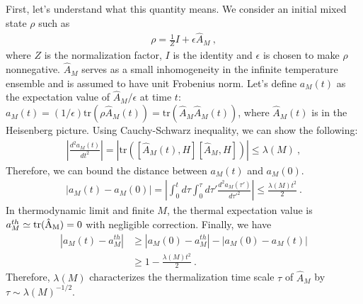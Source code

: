 \documentclass[twocolumn,superscriptaddress, prb]{revtex4-1}
\begin{document}
First, let's understand what this quantity means.
We consider an initial mixed state $\rho$ such as
\begin{align}\label{eq:initial}
\rho = \frac{1}{Z}I + \epsilon\hat{A}_M ~,
\end{align}
where $Z$ is the normalization factor, $I$ is the identity and $\epsilon$ is chosen to make $\rho$ nonnegative.
$\hat{A}_M$ serves as a small inhomogeneity in the infinite temperature ensemble and
is assumed to have unit Frobenius norm.
Let's define $a_M(t)$ as the expectation value of $\hat{A}_M/\epsilon$ at time $t$:
$a_M(t) = (1/\epsilon)\mathrm{tr}(\rho \hat{A}_M(t)) = \mathrm{tr}(\hat{A}_M \hat{A}_M(t))$,
where $\hat{A}_M(t)$ is in the Heisenberg picture.
Using Cauchy-Schwarz inequality, we can show the following:
\begin{align}
\left|\frac{d^2 a_M(t)}{dt^2}\right| = |\mathrm{tr}([\hat{A}_M(t),H][\hat{A}_M,H])| \leq \lambda(M) ~,
\end{align}
Therefore, we can bound the distance between $a_M(t)$ and $a_M(0)$.
\begin{align}
|a_M(t) - a_M(0)| = \left|\int^t_0 d\tau \int^\tau_0 d\tau' \frac{d^2 a_M(\tau')}{d\tau'^2}\right| \leq \frac{\lambda(M) t^2}{2} ~.
\end{align}
In thermodynamic limit and finite $M$, the thermal expectation value is
$a_M^{th} \simeq \rm{tr}(\hat{A}_M) = 0$ with negligible correction.
Finally, we have
\begin{align}
|a_M(t) - a_M^{th}| &\geq |a_M(0) - a_M^{th}| - |a_M(0) - a_M(t)| \nonumber\\
& \geq 1 - \frac{\lambda(M)t^2}{2} ~.
\label{eq:hamiltonian_timescale}
\end{align}
Therefore, $\lambda(M)$ characterizes the thermalization time scale $\tau$ of $\hat{A}_M$ by $\tau \sim \lambda(M)^{-1/2}$.

\end{document}
